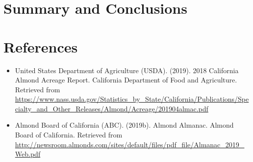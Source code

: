 \documentclass[12pt,]{article}
\begin{document}
\begin{table}

\caption{\label{tab:Question 5}Cover Crop Adoption by Region}
\centering
{}
\end{table}

\newpage

\section{Summary and Conclusions}\label{summary-and-conclusions}

\newpage

\section{References}\label{references}

\begin{itemize}
\item
  United States Department of Agriculture (USDA). (2019). 2018
  California Almond Acreage Report. California Department of Food and
  Agriculture. Retrieved from
  \url{https://www.nass.usda.gov/Statistics_by_State/California/Publications/Specialty_and_Other_Releases/Almond/Acreage/201904almac.pdf}
\item
  Almond Board of California (ABC). (2019b). Almond Almanac. Almond
  Board of California. Retrieved from
  \url{http://newsroom.almonds.com/sites/default/files/pdf_file/Almanac_2019_Web.pdf}
\end{itemize}
\end{document}
